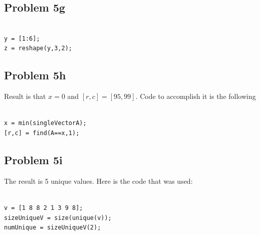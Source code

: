 \documentclass[11pt,psfig]{article}
\begin{document}
\subsection*{Problem 5g}

\begin{verbatim}

y = [1:6];
z = reshape(y,3,2);

\end{verbatim}

\subsection*{Problem 5h}

Result is that $x=0$ and $[r,c]=[95,99]$. Code to accomplish it is the following

\begin{verbatim}

x = min(singleVectorA);
[r,c] = find(A==x,1);

\end{verbatim}

\subsection*{Problem 5i}

The result is 5 unique values. Here is the code that was used:

\begin{verbatim}

v = [1 8 8 2 1 3 9 8];
sizeUniqueV = size(unique(v));
numUnique = sizeUniqueV(2);

\end{verbatim}
\end{document}
